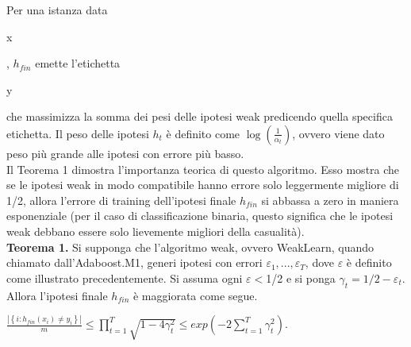 Per una istanza data \begin{it}x\end{it}, \begin{math}h_{fin}\end{math} emette l'etichetta \begin{it}y\end{it} 
che massimizza la somma dei pesi delle ipotesi weak predicendo quella specifica etichetta.
 Il peso delle ipotesi \begin{math}h_t\end{math} \`e definito come \begin{math}\log(\frac{1}{\alpha_t})\end{math},
 ovvero viene dato peso pi\`u grande alle ipotesi con errore pi\`u basso. \\
\newline
Il Teorema 1 dimostra l'importanza teorica di questo algoritmo. 
Esso mostra che se le ipotesi weak in modo compatibile hanno errore solo leggermente migliore di 1/2, 
allora l'errore di training dell'ipotesi finale \begin{math}h_{fin}\end{math} 
si abbassa a zero in maniera esponenziale 
(per il caso di classificazione binaria, questo significa che le ipotesi weak debbano 
essere solo lievemente migliori della casualit\`a).\\
\newline
\textbf{Teorema 1.} Si supponga che l'algoritmo weak, ovvero WeakLearn, quando chiamato dall'Adaboost.M1, 
generi ipotesi con errori \begin{math}\varepsilon_1, ... ,\varepsilon_T\end{math}, dove \begin{math}\varepsilon\end{math} 
\`e definito come illustrato precedentemente. Si assuma ogni \begin{math}\varepsilon <\end{math}1/2 e si ponga 
\begin{math}\gamma_t = 1/2-\varepsilon_t\end{math}. Allora 
l'ipotesi finale \begin{math}h_{fin}\end{math} \`e maggiorata come segue.
\begin{center}
\begin{math}\frac{|\left\{i : h_{fin}(x_i)\ne y_i\right\}|}{m} \le \prod_{t=1}^T\sqrt{1-4\gamma_t^2}
\le exp\left(-2\sum_{t=1}^T\gamma_t^2\right)\end{math}.
\end{center}


